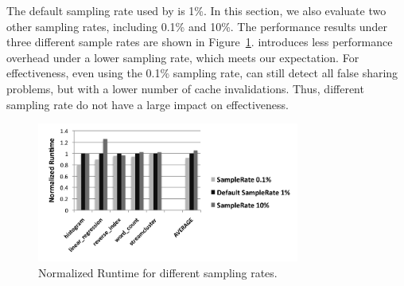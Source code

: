 The default sampling rate used by \Predator{} is 1\%. In this section, we also evaluate two other sampling rates, including 0.1\% and 10\%. The performance results under three different sample rates are shown in Figure~\ref{fig:sample}. \Predator{} introduces less performance overhead under a lower sampling rate, which meets our expectation. For effectiveness, even using the 0.1\% sampling rate, \Predator{} can still detect all false sharing problems, but with a lower number of cache invalidations. Thus, different sampling rate do not have a large impact on effectiveness.
 
\begin{figure}
\begin{center} 
\includegraphics[width=3.4in]{fig/sample}
\end{center}
\caption{Normalized Runtime for different sampling rates.}
\label{fig:sample}
\end{figure}


